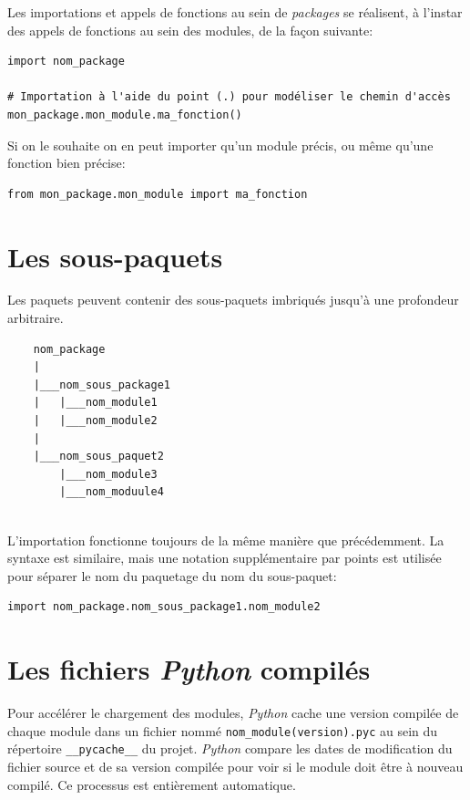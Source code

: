 \documentclass[a4paper,11pt]{book}
\begin{document}
Les importations et appels de fonctions au sein de \textit{packages} se réalisent, à l'instar des appels de fonctions au sein des modules, de la façon suivante:
\begin{lstlisting}
import nom_package

# Importation à l'aide du point (.) pour modéliser le chemin d'accès
mon_package.mon_module.ma_fonction()
\end{lstlisting}
\medskip

Si on le souhaite on en peut importer qu'un module précis, ou même qu'une fonction bien précise:
\begin{lstlisting}
from mon_package.mon_module import ma_fonction
\end{lstlisting}
\medskip

\section{Les sous-paquets}
Les paquets peuvent contenir des sous-paquets imbriqués jusqu'à une profondeur arbitraire.
\begin{verbatim}
    nom_package
    |
    |___nom_sous_package1
    |   |___nom_module1
    |   |___nom_module2
    |
    |___nom_sous_paquet2
        |___nom_module3
        |___nom_moduule4
        
\end{verbatim}
\medskip

L'importation fonctionne toujours de la même manière que précédemment. La syntaxe est similaire, mais une notation supplémentaire par points est utilisée pour séparer le nom du paquetage du nom du sous-paquet:
\begin{lstlisting}[caption=Importation module depuis un sous-paquet]
import nom_package.nom_sous_package1.nom_module2
\end{lstlisting}
\medskip

\section{Les fichiers \textit{Python} \og compilés\fg{}}
Pour accélérer le chargement des modules, \textit{Python} cache une version compilée de chaque module dans un fichier nommé \texttt{nom\_module(version).pyc} au sein du répertoire \texttt{\_\_pycache\_\_} du projet. \textit{Python} compare les dates de modification du fichier source et de sa version compilée pour voir si le module doit être à nouveau compilé. Ce processus est entièrement automatique.
\medskip
\end{document}

